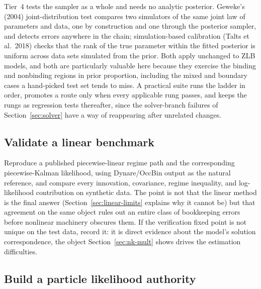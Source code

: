 \documentclass[11pt]{article}
\begin{document}
Tier~4 tests the sampler as a whole and needs no analytic posterior.
Geweke's (2004) joint-distribution test compares two simulators of the same
joint law of parameters and data, one by construction and one through the
posterior sampler, and detects errors anywhere in the chain; simulation-based
calibration (Talts et al.\ 2018) checks that the rank of the true parameter
within the fitted posterior is uniform across data sets simulated from the
prior. Both apply unchanged to ZLB models, and both are particularly
valuable here because they exercise the binding and nonbinding regions in
prior proportion, including the mixed and boundary cases a hand-picked test
set tends to miss. A practical suite runs the ladder in order, promotes a
route only when every applicable rung passes, and keeps the rungs as
regression tests thereafter, since the solver-branch failures of
Section~\ref{sec:solver} have a way of reappearing after unrelated changes.

\subsection*{Validate a linear benchmark}

Reproduce a published piecewise-linear regime path and the corresponding
piecewise-Kalman likelihood, using Dynare/OccBin output as the natural
reference, and compare
every innovation, covariance, regime inequality, and log-likelihood
contribution on synthetic data. The point is not that the linear method is
the final answer (Section~\ref{sec:linear-limits} explains why it cannot be) but that
agreement on the same object rules out an entire class of bookkeeping errors
before nonlinear machinery obscures them. If the verification fixed point is
not unique on the test data, record it: it is direct evidence about the
model's solution correspondence, the object Section~\ref{sec:nk-mult} shows
drives the estimation difficulties.

\subsection*{Build a particle likelihood authority}
\end{document}
